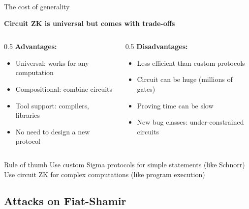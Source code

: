 \ifdefined\PRESENTATION\else\PassOptionsToClass{handout}{beamer}\fi\documentclass[aspectratio=169, lualatex]{beamer}
\begin{document}
\begin{frame}{The cost of generality}
	\begin{center}
		\textbf{Circuit ZK is universal but comes with trade-offs}
	\end{center}
	\begin{columns}[c]
		\begin{column}{0.5\textwidth}
			\textbf{Advantages:}
			\begin{itemize}
				\item Universal: works for any computation
				\item Compositional: combine circuits
				\item Tool support: compilers, libraries
				\item No need to design a new protocol
			\end{itemize}
		\end{column}
		\begin{column}{0.5\textwidth}
			\textbf{Disadvantages:}
			\begin{itemize}
				\item Less efficient than custom protocols
				\item Circuit can be huge (millions of gates)
				\item Proving time can be slow
				\item New bug classes: under-constrained circuits
			\end{itemize}
		\end{column}
	\end{columns}
	\begin{exampleblock}{Rule of thumb}
		Use custom Sigma protocols for simple statements (like Schnorr)\\
		Use circuit ZK for complex computations (like program execution)
	\end{exampleblock}
\end{frame}

\subsection{Attacks on Fiat-Shamir}
\end{document}
